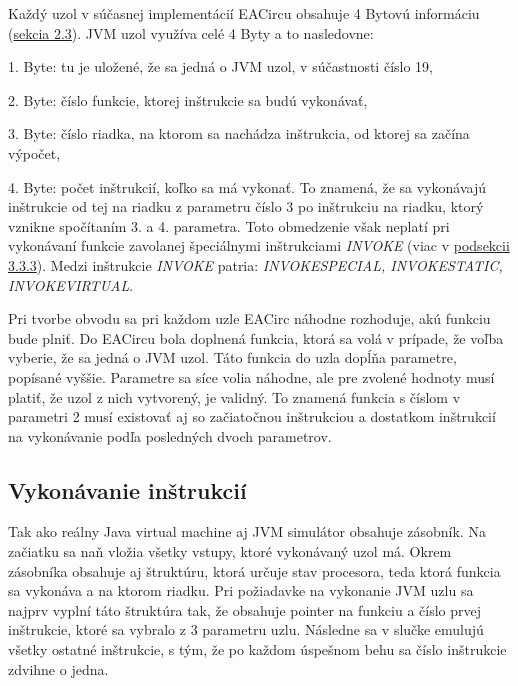 Každý uzol v súčasnej implementácií EACircu obsahuje 4 Bytovú informáciu (\hyperref[sec:nodes]{sekcia 2.3}). JVM uzol využíva celé 4 Byty a to nasledovne: \vspace{0pt}

\begin{myItemize}
	\item 1. Byte: tu je uložené, že sa jedná o JVM uzol, v súčastnosti číslo 19,
	\item 2. Byte: číslo funkcie, ktorej inštrukcie sa budú vykonávať,
	\item 3. Byte: číslo riadka, na ktorom sa nachádza inštrukcia, od ktorej sa začína výpočet,
	\item 4. Byte: počet inštrukcií, koľko sa má vykonať. To znamená, že sa vykonávajú inštrukcie od tej na riadku z parametru číslo 3 po inštrukciu na riadku, ktorý vznikne spočítaním 3. a 4. parametra. Toto obmedzenie však neplatí pri vykonávaní funkcie zavolanej špeciálnymi inštrukciami \textit{INVOKE} (viac v \hyperref[subsec:emulating-ins]{podsekcii 3.3.3}). Medzi inštrukcie \textit{INVOKE} patria: \textit{INVOKESPECIAL, INVOKESTATIC, INVOKEVIRTUAL}. 
\end{myItemize}

Pri tvorbe obvodu sa pri každom uzle EACirc náhodne rozhoduje, akú funkciu bude plniť. Do EACircu bola doplnená funkcia, ktorá sa volá v prípade, že voľba vyberie, že sa jedná o JVM uzol. Táto funkcia do uzla dopĺňa parametre, popísané vyššie. Parametre sa síce volia náhodne, ale pre zvolené hodnoty musí platiť, že uzol z nich vytvorený, je validný. To znamená funkcia s číslom v parametri 2 musí existovať aj so začiatočnou inštrukciou a dostatkom inštrukcií na vykonávanie podľa posledných dvoch parametrov.

\subsection{Vykonávanie inštrukcií} 
\label{subsec:emulating-ins}

Tak ako reálny Java virtual machine aj JVM simulátor obsahuje zásobník. Na začiatku sa naň vložia všetky vstupy, ktoré vykonávaný uzol má. Okrem zásobníka obsahuje aj štruktúru, ktorá určuje stav procesora, teda ktorá funkcia sa vykonáva a na ktorom riadku. Pri požiadavke na vykonanie JVM uzlu sa najprv vyplní táto štruktúra tak, že obsahuje pointer na funkciu a číslo prvej inštrukcie, ktoré sa vybralo z 3 parametru uzlu. Následne sa v slučke emulujú všetky ostatné inštrukcie, s tým, že po každom úspešnom behu sa číslo inštrukcie zdvihne o jedna. 

